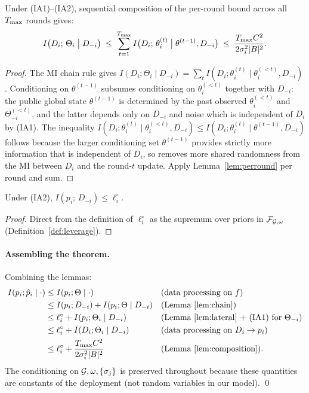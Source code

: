 \begin{lemma}
\label{lem:composition}
Under (IA1)--(IA2), sequential composition of the per-round bound
across all $T_{\max}$ rounds gives:
\[
I\big(D_i;\, \Theta_i \;\big|\; D_{-i}\big)
\;\leq\;
\sum_{t=1}^{T_{\max}} I\big(D_i;\, \theta_i^{(t)} \;\big|\; \theta^{(t-1)}, D_{-i}\big)
\;\leq\;
\frac{T_{\max} C^2}{2\sigma_i^2 |B|^2}.
\]
\end{lemma}
\begin{proof}
The MI chain rule gives
\(I(D_i;\Theta_i \mid D_{-i}) = \sum_t I(D_i; \theta_i^{(t)} \mid \theta_i^{(<t)}, D_{-i})\).
Conditioning on $\theta^{(t-1)}$ subsumes conditioning on
$\theta_i^{(<t)}$ together with $D_{-i}$: the public global state
$\theta^{(t-1)}$ is determined by the past observed $\theta_i^{(<t)}$ and
$\Theta_{-i}^{(<t)}$, and the latter depends only on $D_{-i}$ and noise
which is independent of $D_i$ by (IA1). The
inequality
\(I(D_i; \theta_i^{(t)} \mid \theta_i^{(<t)}, D_{-i})
   \leq I(D_i; \theta_i^{(t)} \mid \theta^{(t-1)}, D_{-i})\)
follows because the larger conditioning set $\theta^{(t-1)}$ provides
strictly more information that is independent of $D_i$, so removes more
shared randomness from the MI between $D_i$ and the round-$t$ update.
Apply Lemma~\ref{lem:perround} per round and sum.
\end{proof}

\begin{lemma}
\label{lem:lateral}
Under (IA2),
\(I(p_i;\, D_{-i}) \leq \ell_i^\circ\).
\end{lemma}
\begin{proof}
Direct from the definition of $\ell_i^\circ$ as the supremum over
priors in $\mathcal{F}_{\mathcal{G},\omega}$ (Definition~\ref{def:leverage}).
\end{proof}

\paragraph{Assembling the theorem.}
Combining the lemmas:
\begin{align*}
I(p_i;\hat p_i \mid \cdot)
&\leq I(p_i;\Theta \mid \cdot)
  && \text{(data processing on }f\text{)} \\
&\leq I(p_i;D_{-i}) + I(p_i;\Theta \mid D_{-i})
  && \text{(Lemma~\ref{lem:chain})} \\
&\leq \ell_i^\circ + I(p_i;\Theta_i \mid D_{-i})
  && \text{(Lemma~\ref{lem:lateral} + (IA1) for }\Theta_{-i}\text{)} \\
&\leq \ell_i^\circ + I(D_i;\Theta_i \mid D_{-i})
  && \text{(data processing on } D_i \to p_i \text{)} \\
&\leq \ell_i^\circ + \frac{T_{\max} C^2}{2\sigma_i^2 |B|^2}
  && \text{(Lemma~\ref{lem:composition}).}
\end{align*}
The conditioning on $\mathcal{G}, \omega, \{\sigma_j\}$ is preserved
throughout because these quantities are constants of the deployment
(not random variables in our model). \qed

